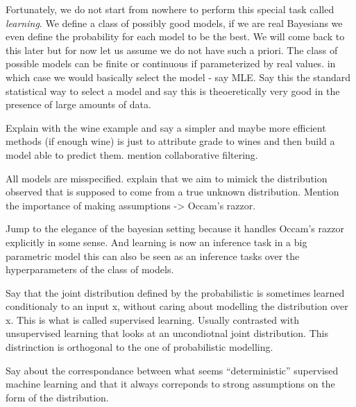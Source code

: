 Fortunately, we do not start from nowhere to perform this special task called \textit{learning}. We define a class of possibly good models, if we are  real Bayesians we even define the probability for each model to be the best. We will come back to this later but for now let us assume we do not have such a priori. The class of possible models can be finite or continuous if parameterized by real values. in which case we would basically select the model - say MLE. Say this the standard statistical way to select a model and say this is theoeretically very good in the presence of large amounts of data.

Explain with the wine example and say a simpler and maybe more efficient methods (if enough wine) is just to attribute grade to wines and then build a model able to predict them. mention collaborative filtering.

All models are misspecified. explain that we aim to mimick the distribution observed that is supposed to come from a true unknown  distribution. Mention the importance of making assumptions -> Occam's razzor.

Jump to the elegance of the bayesian setting because it handles Occam's razzor explicitly in some sense. And learning is now an inference task in a big parametric model this can also be seen as an inference tasks over the hyperparameters of the class of models.



Say that the joint distribution defined by the probabilistic is sometimes learned conditionaly to an input x, without caring about modelling the distribution over x. This is what is called supervised learning. Usually contrasted with unsupervised learning that looks at an uncondiotnal joint distribution. This distrinction is orthogonal to the one of probabilistic modelling.

Say about the correspondance between what seems ``deterministic'' supervised machine learning and that it always correponds to strong assumptions on the form of the distribution.


